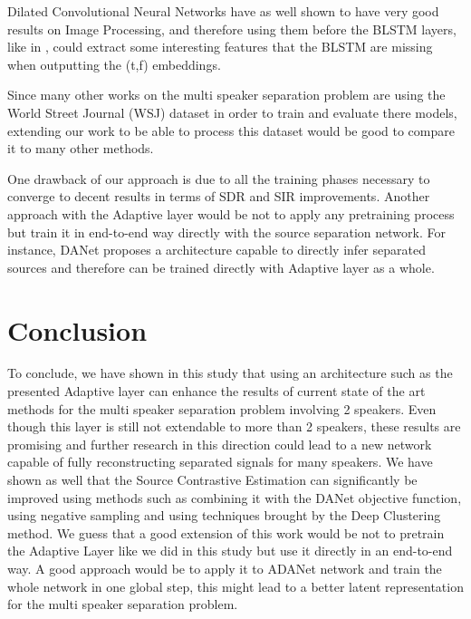 \documentclass[master, tikz, final,11pt, dvipdfmx]{iscs-thesis}
\begin{document}
Dilated Convolutional Neural Networks have as well shown to have very good results on Image Processing, and therefore using them before the BLSTM layers, like in \cite{ImageSS}, could extract some interesting features that the BLSTM are missing when outputting the (t,f) embeddings.

Since many other works on the multi speaker separation problem are using the World Street Journal (WSJ) dataset in order to train and evaluate there models, extending our work to be able to process this dataset would be good to compare it to many other methods.

One drawback of our approach is due to all the training phases necessary to converge to decent results in terms of SDR and SIR improvements. Another approach with the Adaptive layer would be not to apply any pretraining process but train it in end-to-end way directly with the source separation network. For instance, DANet \cite{DANet} proposes a architecture capable to directly infer separated sources and therefore can be trained directly with Adaptive layer as a whole.

\chapter{Conclusion}

To conclude, we have shown in this study that using an architecture such as the presented Adaptive layer can enhance the results of current state of the art methods for the multi speaker separation problem involving 2 speakers. Even though this layer is still not extendable to more than 2 speakers, these results are promising and further research in this direction could lead to a new network capable of fully reconstructing separated signals for many speakers.
We have shown as well that the Source Contrastive Estimation can significantly be improved using methods such as combining it with the DANet objective function, using negative sampling and using techniques brought by the Deep Clustering method.
We guess that a good extension of this work would be not to pretrain the Adaptive Layer like we did in this study but use it directly in an end-to-end way. A good approach would be to apply it to ADANet \cite{DANet2} network and train the whole network in one global step, this might lead to a better latent representation for the multi speaker separation problem.





\end{document}
